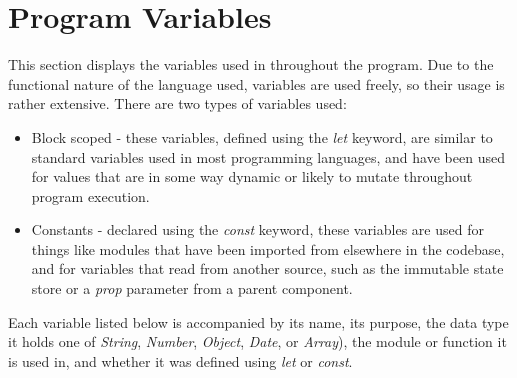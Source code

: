 \section{Program Variables}
This section displays the variables used in throughout the program. Due to the functional nature of the language used, variables are used freely, so their usage is rather extensive. There are two types of variables used:

\begin{itemize}
  \item Block scoped - these variables, defined using the \textit{let} keyword, are similar to standard variables used in most programming languages, and have been used for values that are in some way dynamic or likely to mutate throughout program execution.
  \item Constants - declared using the \textit{const} keyword, these variables are used for things like modules that have been imported from elsewhere in the codebase, and for variables that read from another source, such as the immutable state store or a \textit{prop} parameter from a parent component.
\end{itemize}

Each variable listed below is accompanied by its name, its purpose, the data type it holds one of \textit{String}, \textit{Number}, \textit{Object}, \textit{Date}, or \textit{Array}), the module or function it is used in, and whether it was defined using \textit{let} or \textit{const}.

